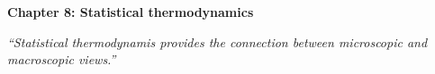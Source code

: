\renewcommand{\theequation}{8.\arabic{equation}}

\begin{frame}
\begin{center}
{\bf Chapter 8: Statistical thermodynamics}\\
\end{center}

\scriptsize

\vspace*{3cm}

\begin{center}
\textit{``Statistical thermodynamis provides the connection between microscopic and macroscopic views.''}
\end{center}

\end{frame}

\scriptsize





